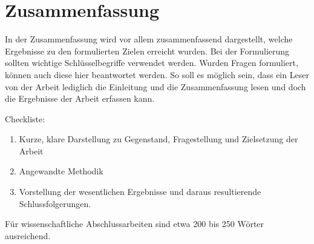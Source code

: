 \chapter*{Zusammenfassung}
In der Zusammenfassung wird vor allem zusammenfassend dargestellt, welche Ergebnisse zu den formulierten Zielen erreicht wurden.
Bei der Formulierung sollten wichtige Schlüsselbegriffe verwendet werden.
Wurden Fragen formuliert, können auch diese hier beantwortet werden.
So soll es möglich sein, dass ein Leser von der Arbeit lediglich die Einleitung und die Zusammenfassung lesen und doch die Ergebnisse der Arbeit erfassen kann.

Checkliste:
\begin{enumerate}
\item Kurze, klare Darstellung zu Gegenstand, Fragestellung und Zielsetzung der Arbeit
\item Angewandte Methodik
\item Vorstellung der wesentlichen Ergebnisse und daraus resultierende Schlussfolgerungen.
\end{enumerate}
Für wissenschaftliche Abschlussarbeiten sind etwa 200 bis 250 Wörter ausreichend.


\vfill
